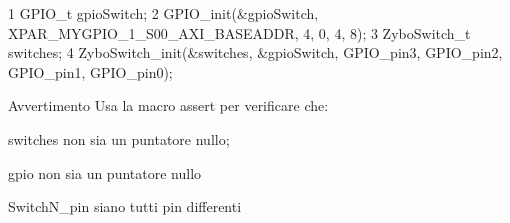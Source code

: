 \begin{DoxyCode}
1 GPIO\_t gpioSwitch;
2 GPIO\_init(&gpioSwitch, XPAR\_MYGPIO\_1\_S00\_AXI\_BASEADDR, 4, 0, 4, 8);
3 ZyboSwitch\_t switches;
4 ZyboSwitch\_init(&switches, &gpioSwitch, GPIO\_pin3, GPIO\_pin2, GPIO\_pin1, GPIO\_pin0);
\end{DoxyCode}


\begin{DoxyWarning}{Avvertimento}
Usa la macro assert per verificare che\+:
\begin{DoxyItemize}
\item switches non sia un puntatore nullo;
\item gpio non sia un puntatore nullo
\item Switch\+N\+\_\+pin siano tutti pin differenti 
\end{DoxyItemize}
\end{DoxyWarning}
